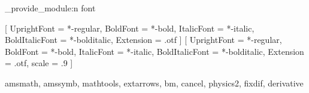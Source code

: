 \hduthesis_provide_module:n {font}

\RequirePackage[zihao = -4]{ctex}
\linespread{1.39}
\setlength{\parindent}{2\ccwd}
\setmainfont{texgyretermes}
  [
    UprightFont = *-regular,
    BoldFont = *-bold,
    ItalicFont = *-italic,
    BoldItalicFont = *-bolditalic,
    Extension = .otf
  ]
\setsansfont{texgyreheros}
  [
    UprightFont = *-regular,
    BoldFont = *-bold,
    ItalicFont = *-italic,
    BoldItalicFont = *-bolditalic,
    Extension = .otf,
    scale = .9
  ]

\newcommand\semilarge
  {
    \@setfontsize\semilarge{14}{16.5}
  }

\RequirePackage
{
  amsmath, amssymb, mathtools, extarrows,
  bm, cancel, physics2, fixdif, derivative
}

\renewcommand\theequation{\arabic{chapter}-\arabic{equation}}
\AtBeginDocument{
  \setlength{\abovedisplayshortskip}{-18pt}
  \setlength{\abovedisplayskip}{6pt}
  \setlength{\belowdisplayshortskip}{6pt}
  \setlength{\belowdisplayskip}{6pt}
}

\endinput